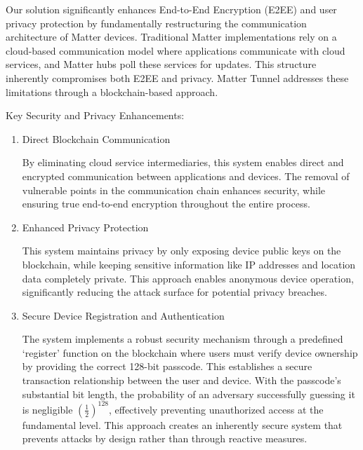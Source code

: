 \documentclass[conference]{IEEEtran}
\begin{document}
\begin{enumerate}[itemsep=2ex, parsep=1ex]
	      Our solution significantly enhances End-to-End Encryption (E2EE) and user
	      privacy protection by fundamentally restructuring the communication
	      architecture of Matter devices. Traditional Matter implementations rely on
	      a cloud-based communication model where applications communicate with cloud
	      services, and Matter hubs poll these services for updates. This structure inherently
	      compromises both E2EE and privacy. Matter Tunnel addresses these
	      limitations through a blockchain-based approach.
	      	      	      
	      Key Security and Privacy Enhancements:
	      	      	      
	      \begin{enumerate}[itemsep=2ex, parsep=1ex]
	      	\item Direct Blockchain Communication
	      	      	      	      	      	      
	      	      By eliminating cloud service intermediaries, this system enables direct
	      	      and encrypted communication between applications and devices. The
	      	      removal of vulnerable points in the communication chain enhances
	      	      security, while ensuring true end-to-end encryption throughout the entire
	      	      process.
	      	      	      	      	      	      
	      	\item Enhanced Privacy Protection
	      	      	      	      	      	      
	      	      This system maintains privacy by only exposing device public keys on
	      	      the blockchain, while keeping sensitive information like IP addresses and
	      	      location data completely private. This approach enables anonymous
	      	      device operation, significantly reducing the attack surface for potential
	      	      privacy breaches.
	      	      	      	      	      	      
	      	\item Secure Device Registration and Authentication
	      	      	      	      	      	                      
	      	      The system implements a robust security mechanism through a predefined `register' 
	      	      function on the blockchain where users must verify device ownership by providing 
	      	      the correct 128-bit passcode. This establishes a secure transaction relationship 
	      	      between the user and device. With the passcode's substantial bit length, the 
	      	      probability of an adversary successfully guessing it is negligible 
	      	      $\left(\frac{1}{2}\right)^{128}$, effectively preventing unauthorized access at the fundamental level. 
	      	      This approach creates an inherently secure system that prevents attacks 
	      	      by design rather than through reactive measures.
	      \end{enumerate}
	      	      	      

\end{enumerate}
\end{document}
